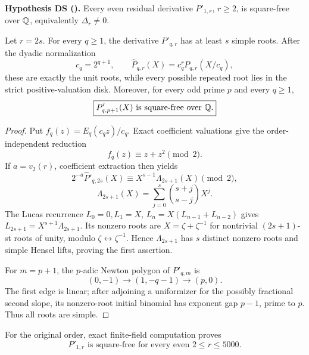 \begin{notebox}
\textbf{Hypothesis DS (\OPEN).} Every even residual derivative
$P'_{1,r}$, $r\ge2$, is square-free over $\mathbb Q$, equivalently
$\Delta_r\ne0$.
\end{notebox}

\begin{theorem}\label{thm:partial-sep}
Let $r=2s$. For every $q\ge1$, the derivative $P'_{q,r}$ has at least
$s$ simple roots. After the dyadic normalization
\[
c_q=2^{q+1},\qquad
\widehat P_{q,r}(X)=c_q^rP_{q,r}(X/c_q),
\]
these are exactly the unit roots, while every possible repeated root lies
in the strict positive-valuation disk. Moreover, for every odd prime $p$
and every $q\ge1$,
\begin{equation}
\boxed{P'_{q,p+1}(X)\text{ is square-free over }\mathbb Q.}
\label{eq:prime-successor}
\end{equation}
\end{theorem}

\begin{proof}
Put $f_q(z)=E_q(c_qz)/c_q$. Exact coefficient valuations give the
order-independent reduction
\[
f_q(z)\equiv z+z^2\pmod2.
\]
If $a=v_2(r)$, coefficient extraction then yields
\begin{equation}
2^{-a}\widehat P'_{q,2s}(X)\equiv
X^{s-1}\Lambda_{2s+1}(X)\pmod2,
\label{eq:lambda-reduction}
\end{equation}
\begin{equation}
\Lambda_{2s+1}(X)=
\sum_{j=0}^s\binom{s+j}{s-j}X^j.
\label{eq:lambda}
\end{equation}
The Lucas recurrence $L_0=0,L_1=X$,
$L_n=X(L_{n-1}+L_{n-2})$ gives
$L_{2s+1}=X^{s+1}\Lambda_{2s+1}$. Its nonzero roots are
$X=\zeta+\zeta^{-1}$ for nontrivial $(2s+1)$-st roots of unity, modulo
$\zeta\leftrightarrow\zeta^{-1}$. Hence $\Lambda_{2s+1}$ has $s$
distinct nonzero roots and simple Hensel lifts, proving the first assertion.

For $m=p+1$, the $p$-adic Newton polygon of $P'_{q,m}$ is
\begin{equation}
(0,-1)\longrightarrow(1,-q-1)\longrightarrow(p,0).
\label{eq:prime-successor-NP}
\end{equation}
The first edge is linear; after adjoining a uniformizer for the possibly
fractional second slope, its nonzero-root initial binomial has exponent gap
$p-1$, prime to $p$. Thus all roots are simple.
\end{proof}

\begin{corollary}\label{cor:residual-5000}
For the original order, exact finite-field computation proves
\begin{equation}
\boxed{P'_{1,r}\text{ is square-free for every even }2\le r\le5000.}
\label{eq:residual-5000}
\end{equation}
\end{corollary}

